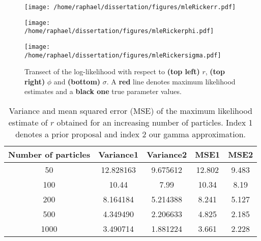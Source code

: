 \documentclass[12pt]{article}
\newcommand{\ra}[1]{\renewcommand{\arraystretch}{#1}}
\begin{document}
	\begin{figure}[htb]
		\centering
		\begin{minipage}{0.4\textwidth}
			\centering
			\texttt{[image: /home/raphael/dissertation/figures/mleRickerr.pdf]}
		\end{minipage}
		\begin{minipage}{0.4\textwidth}
			\centering
			\texttt{[image: /home/raphael/dissertation/figures/mleRickerphi.pdf]}
		\end{minipage}
		\begin{minipage}{0.4\textwidth}
			\centering
			\texttt{[image: /home/raphael/dissertation/figures/mleRickersigma.pdf]}
		\end{minipage}
		\caption[Transect of the log-likelihood of the Ricker model.]{Transect of the log-likelihood with respect to \textbf{(top left)} $r$, \textbf{(top right)} $\phi$ and \textbf{(bottom)} $\sigma$. A \textbf{red} line denotes maximum likelihood estimates and a \textbf{black one} true parameter values.}
		\label{fig:transect}
	\end{figure}
	
	\begin{table}[htb]
		\centering
		\ra{1.3}
		\begin{tabular}{@{}ccccc@{}} \toprule
			Number of particles & Variance1 &  Variance2 & MSE1 & MSE2 \\ \midrule
			50 & 12.828163 &  9.675612 & 12.802 & 9.483\\ 
			100 & 10.44 & 7.99 & 10.34 & 8.19\\ 
			200 & 8.164184 & 5.214388 &  8.241 & 5.127\\ 
			500 & 4.349490 & 2.206633 & 4.825 & 2.185\\ 
			1000 & 3.490714 & 1.881224 & 3.661  & 2.228\\  \bottomrule
		\end{tabular}
		\caption[Variance and mean squared error of the MLE of $r$]{Variance and mean squared error (MSE) of the maximum likelihood estimate of $r$ obtained for an increasing number of particles. Index 1 denotes a prior proposal and index 2 our gamma approximation.}
		\label{table:mleR}
	\end{table}
\end{document}
